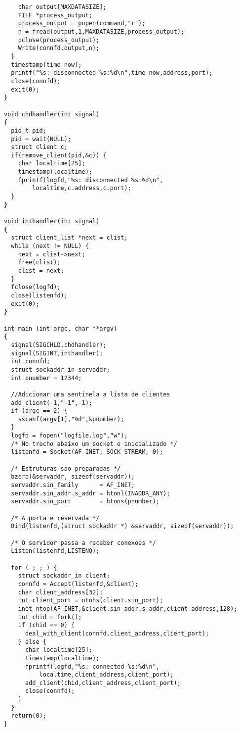 \documentclass[11pt]{article}
\begin{document}
\begin{lstlisting}
    char output[MAXDATASIZE];
    FILE *process_output;
    process_output = popen(command,"r");
    n = fread(output,1,MAXDATASIZE,process_output);
    pclose(process_output);
    Write(connfd,output,n);
  }
  timestamp(time_now);
  printf("%s: disconnected %s:%d\n",time_now,address,port);
  close(connfd);
  exit(0);
}

void chdhandler(int signal)
{
  pid_t pid;
  pid = wait(NULL);
  struct client c;
  if(remove_client(pid,&c)) {
    char localtime[25];
    timestamp(localtime);
    fprintf(logfd,"%s: disconnected %s:%d\n",
	    localtime,c.address,c.port);
  }
}

void inthandler(int signal)
{
  struct client_list *next = clist;
  while (next != NULL) {
    next = clist->next;
    free(clist);
    clist = next;
  }
  fclose(logfd);
  close(listenfd);
  exit(0);
}

int main (int argc, char **argv)
{
  signal(SIGCHLD,chdhandler);
  signal(SIGINT,inthandler);
  int connfd;
  struct sockaddr_in servaddr;
  int pnumber = 12344;

  //Adicionar uma sentinela a lista de clientes
  add_client(-1,"-1",-1);
  if (argc == 2) {
    sscanf(argv[1],"%d",&pnumber);
  }
  logfd = fopen("logfile.log","w");
  /* No trecho abaixo um socket e inicializado */
  listenfd = Socket(AF_INET, SOCK_STREAM, 0);
  
  /* Estruturas sao preparadas */
  bzero(&servaddr, sizeof(servaddr));
  servaddr.sin_family      = AF_INET;
  servaddr.sin_addr.s_addr = htonl(INADDR_ANY);
  servaddr.sin_port        = htons(pnumber);   

  /* A porta e reservada */
  Bind(listenfd,(struct sockaddr *) &servaddr, sizeof(servaddr));

  /* O servidor passa a receber conexoes */
  Listen(listenfd,LISTENQ);

  for ( ; ; ) {
    struct sockaddr_in client;
    connfd = Accept(listenfd,&client);
    char client_address[32];
    int client_port = ntohs(client.sin_port);
    inet_ntop(AF_INET,&client.sin_addr.s_addr,client_address,128);
    int chid = fork();
    if (chid == 0) {
      deal_with_client(connfd,client_address,client_port);
    } else {
      char localtime[25];
      timestamp(localtime);
      fprintf(logfd,"%s: connected %s:%d\n",
	      localtime,client_address,client_port);
      add_client(chid,client_address,client_port);
      close(connfd);
    }
  }
  return(0);
}
\end{lstlisting}
\end{document}
